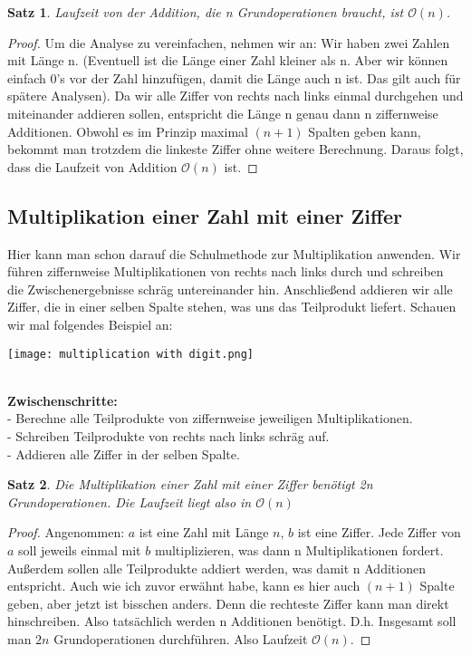 \documentclass[11pt,a4paper, twoside]{article}
\newtheorem{theorem}{Satz}
\theoremstyle{definition}
\begin{document}
\begin{theorem}
Laufzeit von der Addition, die n Grundoperationen braucht, ist $\mathcal{O}(n)$.
\end{theorem}
\begin{proof}
Um die Analyse zu vereinfachen, nehmen wir an: Wir haben zwei Zahlen mit Länge n. (Eventuell ist die Länge einer Zahl kleiner als n. Aber wir können einfach 0’s vor der Zahl hinzufügen, damit die Länge auch n ist. Das gilt auch für spätere Analysen). 
Da wir alle Ziffer von rechts nach links einmal durchgehen und miteinander addieren sollen, entspricht die Länge n genau dann n ziffernweise Additionen.  Obwohl es im Prinzip maximal $(n + 1)$ Spalten geben kann, bekommt man trotzdem die linkeste Ziffer ohne weitere Berechnung. Daraus folgt, dass die Laufzeit von Addition $\mathcal{O}(n)$ ist.
\end{proof}


\subsection{Multiplikation einer Zahl mit einer Ziffer}
Hier kann man schon darauf die Schulmethode zur Multiplikation anwenden. Wir führen ziffernweise Multiplikationen von rechts nach links durch und schreiben die Zwischenergebnisse schräg untereinander hin. Anschließend addieren wir alle Ziffer, die in einer selben Spalte stehen, was uns das Teilprodukt liefert. Schauen wir mal folgendes Beispiel an:\\
\centerline{\texttt{[image: multiplication with digit.png]}}\\
\textbf{Zwischenschritte:} \\
- Berechne alle Teilprodukte von ziffernweise jeweiligen Multiplikationen. \\
- Schreiben Teilprodukte von rechts nach links schräg auf.\\
- Addieren alle Ziffer in der selben Spalte. 

\begin{theorem}
Die Multiplikation einer Zahl mit einer Ziffer benötigt 2n Grundoperationen. Die Laufzeit liegt also in $\mathcal{O}(n)$
\end{theorem}
\begin{proof}
Angenommen: $a$ ist eine Zahl mit Länge $n$, $b$ ist eine Ziffer. Jede Ziffer von $a$ soll jeweils einmal mit $b$ multiplizieren, was dann n Multiplikationen fordert. Außerdem sollen alle Teilprodukte addiert werden, was damit n Additionen entspricht. Auch wie ich zuvor erwähnt habe, kann es hier auch $(n + 1)$ Spalte geben, aber jetzt ist bisschen anders. Denn die rechteste Ziffer kann man direkt hinschreiben. Also tatsächlich werden n Additionen benötigt.  D.h. Insgesamt soll man $2n$ Grundoperationen durchführen. Also Laufzeit $\mathcal{O}(n)$.
\end{proof}
\end{document}
